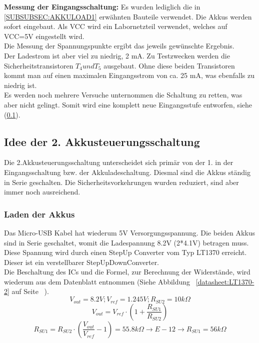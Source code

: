 \documentclass[12pt,a4paper]{article}
\begin{document}
{\textbf{Messung der Eingangsschaltung:} Es wurden lediglich die in \ref{SUBSUBSEC:AKKULOAD1} erwähnten Bauteile verwendet. Die Akkus werden sofort eingebaut. Als VCC wird ein Labornetzteil verwendet, welches auf VCC=5V eingestellt wird. \\
Die Messung der Spannungspunkte ergibt das jeweils gewünschte Ergebnis. \\
Der Ladestrom ist aber viel zu niedrig, 2 mA. Zu Testzwecken werden die Sicherheitstransistoren $T_4 und T_5$ ausgebaut. Ohne diese beiden Transistoren kommt man auf einen maximalen Eingangsstrom von ca. 25 mA, was ebenfalls zu niedrig ist. \\
Es werden noch mehrere Versuche unternommen die Schaltung zu retten, was aber nicht gelingt. Somit wird eine komplett neue Eingangsstufe entworfen, siehe (\ref{SUBSEC:AKKUSTEUR2}).

\newpage
\subsection{Idee der 2. Akkusteuerungsschaltung}
\label{SUBSEC:AKKUSTEUR2}

Die 2.Akkusteuerungsschaltung unterscheidet sich primär von der 1. in der Eingangsschaltung bzw. der Akkuladeschaltung. Diesmal sind die Akkus ständig in Serie geschalten. Die Sicherheitsvorkehrungen wurden reduziert, sind aber immer noch ausreichend.

\subsubsection{Laden der Akkus}
\label{SUBSUBSEC:AKKULOAD2}

Das Micro-USB Kabel hat wiederum 5V Versorgungsspannung. Die beiden Akkus sind in Serie geschaltet, womit die Ladespannung 8.2V (2*4.1V) betragen muss. Diese Spannung wird durch einen StepUp Converter vom Typ LT1370 erreicht. Dieser ist ein verstellbarer StepUpDownConverter. \\
Die Beschaltung des ICs und die Formel, zur Berechnung der Widerstände, wird wiederum aus dem Datenblatt entnommen (Siehe Abbildung ~\ref{datasheet:LT1370-2} auf Seite ~\pageref{datasheet:LT1370-2}). \\
\[V_{out}=8.2V;V_{ref}=1.245V;R_{SU2}=10k\Omega\]
\[V_{out}=V_{ref} \cdot \left( 1 + \frac{R_{SU1}}{R_{SU2}} \right)\]
\[R_{SU1} = R_{SU2} \cdot \left( \frac{V_{out}}{V_{ref}} - 1 \right) = 55.8 k\Omega \rightarrow E-12 \rightarrow R_{SU1} = 56 k \Omega\]

}
\end{document}
